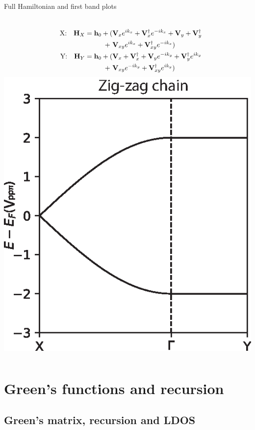 \documentclass[hyperref={colorlinks=true,urlcolor=blue,linkcolor=.},aspectratio=1610,mathserif]{beamer}
\begin{document}
\begin{frame}{Full Hamiltonian and first band plots}
\begin{overprint}
\begin{columns}[c]
		\end{columns}
		\begin{columns}[c]
			\begin{align}
				\qq{X:} \vb{H}_{X} = \vb{h}_0 + ( & \vb{V}_{x}e^{ik_x} + \vb{V}_{x}^{\dagger}e^{-ik_x} + \vb{V}_{y} + \vb{V}_{y}^{\dagger}\nonumber \\
				+\                                & \vb{V}_{xy}e^{ik_x} + \vb{V}_{xy}^{\dagger}e^{-ik_x}) \nonumber                                 \\
				\qq{Y:} \vb{H}_{Y} = \vb{h}_0 + ( & \vb{V}_{x} + \vb{V}_{x}^{\dagger} + \vb{V}_{y}e^{-ik_y} + \vb{V}_{y}^{\dagger}e^{ik_y}\nonumber \\
				+\                                & \vb{V}_{xy}e^{-ik_y} + \vb{V}_{xy}^{\dagger}e^{ik_y}) \nonumber
			\end{align}
			\includegraphics[width=.75\textwidth]{Figures/Beta2.eps}
		\end{columns}
	\end{overprint}
\end{frame}

\section{Green's functions and recursion}
\subsection{Green's matrix, recursion and LDOS}
\end{document}
